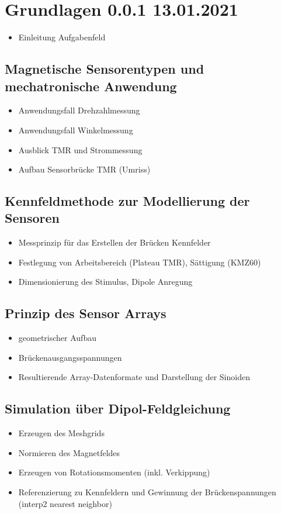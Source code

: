 %

\chapter{Grundlagen 0.0.1 13.01.2021}\label{ch:grundlagen}
	\begin{itemize}
		\item Einleitung Aufgabenfeld
	\end{itemize}

\section{Magnetische Sensorentypen und mechatronische Anwendung}
	\begin{itemize}
		\item Anwendungsfall Drehzahlmessung
		\item Anwendungsfall Winkelmessung
		\item Ausblick TMR und Strommessung
		\item Aufbau Sensorbrücke TMR (Umriss)
	\end{itemize}

\section{Kennfeldmethode zur Modellierung der Sensoren}
	\begin{itemize}
		\item Messprinzip für das Erstellen der Brücken Kennfelder
		\item Festlegung von Arbeitsbereich (Plateau TMR), Sättigung (KMZ60)
		\item Dimensionierung des Stimulus, Dipole Anregung
	\end{itemize}

\section{Prinzip des Sensor Arrays}
	\begin{itemize}
		\item geometrischer Aufbau
		\item Brückenausgangsspannungen
		\item Resultierende Array-Datenformate und Darstellung der Sinoiden
	\end{itemize}

\section{Simulation über Dipol-Feldgleichung}
	\begin{itemize}
		\item Erzeugen des Meshgrids
		\item Normieren des Magnetfeldes
		\item Erzeugen von Rotationsmomenten (inkl. Verkippung)
		\item Referenzierung zu Kennfeldern und Gewinnung der Brückenspannungen (interp2 nearest neighbor)
	\end{itemize}

